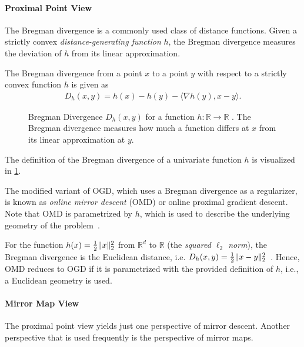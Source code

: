 \paragraph{Proximal Point View} The Bregman divergence is a commonly used class of distance functions. Given a strictly convex \emph{distance-generating function} $h$, the Bregman divergence measures the deviation of $h$ from its linear approximation.

\begin{definition}
\cite{Chen2018} The Bregman divergence from a point $x$ to a point $y$ with respect to a strictly convex function $h$ is given as \begin{align*}
    D_h(x,y) = h(x) - h(y) - \langle\nabla h(y), x - y\rangle.
\end{align*}
\end{definition}

\begin{figure}
    \centering
    
    \caption{Bregman Divergence $D_h(x,y)$ for a function $h : \mathbb{R} \to \mathbb{R}$ \cite{Chen2018}. The Bregman divergence measures how much a function differs at $x$ from its linear approximation at $y$.}
    \label{fig:bregman_divergence}
\end{figure}

The definition of the Bregman divergence of a univariate function $h$ is visualized in \cref{fig:bregman_divergence}.

The modified variant of OGD, which uses a Bregman divergence as a regularizer, is known as \emph{online mirror descent} (OMD) or online proximal gradient descent. Note that OMD is parametrized by $h$, which is used to describe the underlying geometry of the problem~\cite{Chen2018}.

For the function $h(x) = \frac{1}{2} \lVert x\rVert_2^2$ from $\mathbb{R}^d$ to $\mathbb{R}$ (the \emph{squared $\ell_2$ norm}), the Bregman divergence is the Euclidean distance, i.e. $D_h(x,y) = \frac{1}{2} \lVert x-y\rVert_2^2$~\cite{Chen2018}. Hence, OMD reduces to OGD if it is parametrized with the provided definition of $h$, i.e., a Euclidean geometry is used.

\paragraph{Mirror Map View} The proximal point view yields just one perspective of mirror descent. Another perspective that is used frequently is the perspective of mirror maps.

